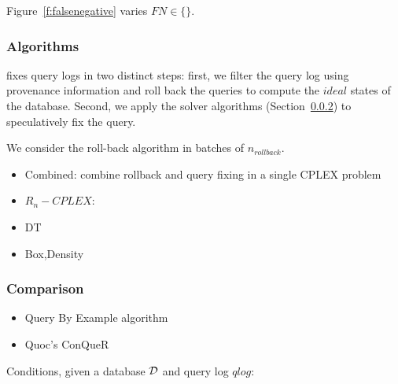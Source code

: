 Figure~\ref{f:falsenegative} varies $FN \in \{\}$.














\iffalse
\subsubsection{Algorithms}

\sys fixes query logs in two distinct steps: first, we filter the query log using 
provenance information and roll back the queries to compute the $ideal$ states of the database.
Second, we apply the solver algorithms (Section~\ref{}) to speculatively fix the query.

We consider the roll-back algorithm in batches of $n_{rollback}$.

\begin{itemize}
\item Combined:  combine rollback and query fixing in a single CPLEX problem
\item $R_n-CPLEX$: 
\item DT
\item Box,Density
\end{itemize}



\subsubsection{Comparison}

\begin{itemize}
\item Query By Example algorithm
\item Quoc's ConQueR
\end{itemize}

Conditions, given a database ${\cal D}$ and query log $qlog$:

